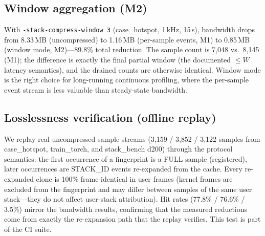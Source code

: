 \documentclass[letterpaper,twocolumn,10pt]{article}
\begin{document}
\subsection{Window aggregation (M2)}
With \texttt{-stack-compress-window 3} (case\_hotspot, 1\,kHz,
15\,s), bandwidth drops from 8.33\,MB (uncompressed) to 1.16\,MB
(per-sample events, M1) to 0.85\,MB (window mode, M2)---89.8\% total
reduction. The sample count is 7{,}048 vs.\ 8{,}145 (M1); the difference
is exactly the final partial window (the documented $\leq W$ latency
semantics), and the drained counts are otherwise identical. Window mode is
the right choice for long-running continuous profiling, where the
per-sample event stream is less valuable than steady-state bandwidth.

\subsection{Losslessness verification (offline replay)}
We replay real uncompressed sample streams (3{,}159 / 3{,}852 / 3{,}122
samples from case\_hotspot, train\_torch, and stack\_bench d200)
through the protocol semantics: the first occurrence of a fingerprint is a
FULL sample (registered), later occurrences are STACK\_ID events
re-expanded from the cache. Every re-expanded clone is 100\%
frame-identical in user frames (kernel frames are excluded from the
fingerprint and may differ between samples of the same user stack---they
do not affect user-stack attribution). Hit rates (77.8\% / 76.6\% /
3.5\%) mirror the bandwidth results, confirming that the measured
reductions come from exactly the re-expansion path that the replay
verifies. This test is part of the CI suite.
\end{document}
